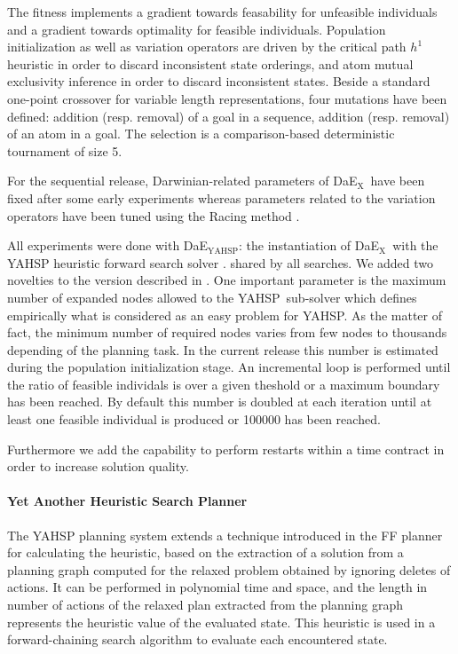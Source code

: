 \documentclass{sig-alternate}
\newcommand{\DAEX}{{\sc DaE$_{\text{X}}$}}
\newcommand{\DAEYAHSP}{{\sc DaE$_{\text{YAHSP}}$}}
\newcommand{\YAHSP}{{\sc YAHSP}}
\begin{document}
The fitness implements a gradient towards feasability for unfeasible individuals
and a gradient towards optimality for feasible individuals.  Population
initialization as well as variation operators are driven by the critical path
$h^1$ heuristic \cite{h1:aips2000} in order to discard inconsistent state
orderings, and atom mutual exclusivity inference in order to discard
inconsistent states.  Beside a standard one-point crossover for variable length
representations, four mutations have been defined: addition (resp. removal) of a
goal in a sequence, addition (resp. removal) of an atom in a goal.  The
selection is a comparison-based deterministic tournament of size 5.

For the sequential release, Darwinian-related parameters of \DAEX\ have been
fixed after some early experiments \cite{dae:evocop2006} whereas parameters
related to the variation operators have been tuned using the Racing method
\cite{dae:gecco2010}.

All experiments were done with \DAEYAHSP: the instantiation of \DAEX\ with the
YAHSP heuristic forward search solver \cite{yahsp:icaps2004}. %
shared by all searches.  We added two novelties to the version described in
\cite{dae:icaps2010}.  One important parameter is the maximum number of expanded
nodes allowed to the \YAHSP\ sub-solver which defines empirically what is
considered as an easy problem for \YAHSP. As the matter of fact, the minimum
number of required nodes varies from few nodes to thousands depending of the
planning task.  In the current release this number is estimated during the
population initialization stage. An incremental loop is performed until the
ratio of feasible individals is over a given theshold or a maximum boundary has
been reached. By default this number is doubled at each iteration until at least
one feasible individual is produced or 100000 has been reached.

Furthermore we add the capability to perform restarts within a time contract in
order to increase solution quality.

\paragraph{Yet Another Heuristic Search Planner} %

The YAHSP planning system 
\cite{yahsp:icaps2004}  extends  a  technique   introduced  in  the  FF  planner
\cite{ff:jair01}  for calculating  the  heuristic, based  on  the extraction  of
a solution  from a planning graph  computed for the relaxed  problem obtained by
ignoring deletes of actions.  It can  be performed in polynomial time and space,
and  the length in  number of  actions of  the relaxed  plan extracted  from the
planning  graph represents  the heuristic  value of  the evaluated  state.  This
heuristic  is used  in  a  forward-chaining search  algorithm  to evaluate  each
encountered state.
\end{document}
